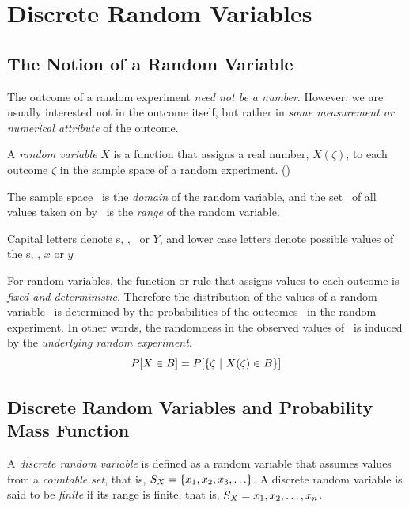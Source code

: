 
\chapter{Discrete Random Variables}


\section{The Notion of a Random Variable}

\bit
	\item The outcome of a random experiment \emph{need not be a number}.
	However, we are usually interested not in the outcome itself,
	but rather in \emph{some measurement or numerical attribute} of the outcome.

	\item A \emph{random variable} $X$ is a function
	that assigns a real number, $X(\zeta)$,
	to each outcome $\zeta$ in the sample space of a random experiment.
	()

	\item The sample space \sspace\ is the \emph{domain} of the random variable,
	and the set \ssx\ of all values taken on by \X\ is the \emph{range} of the random variable.

	\item Capital letters denote \randvar s, \eg, \X\ or $Y$,
	and lower case letters denote possible values of the \randvar s,
	\eg, $x$ or $y$

	\item {}

	\item For random variables,
	the function or rule that assigns values to each outcome is \emph{fixed and deterministic}.
	Therefore the distribution of the values of a random variable \X\ is
	determined by the probabilities of the outcomes \mzeta\ in the random experiment.
	In other words, the randomness in the observed values of \X\ is
	induced by the \emph{underlying random experiment}.
	\[
		P[X \in B] = P[ \{\zeta~|~X(\zeta)\in B\}]
	\]

\eit

\section{Discrete Random Variables and Probability Mass Function}

\bit
	\item A \emph{discrete random variable \X}
	is defined as a random variable that assumes values from a \emph{countable set},
	that is, $S_X = \{x_1, x_2, x_3, \ldots \}$.
	A discrete random variable is said to be \emph{finite} if its range is finite,
	that is, $S_X = {x}_1, {x}_2, \ldots, {x}_{n} $.

